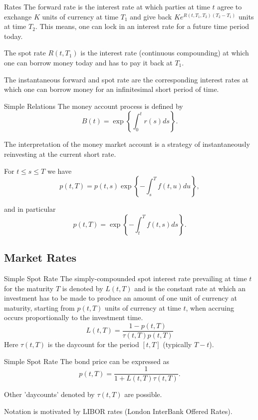 Rates
	The forward rate is the interest rate at which parties
	at time $t$ agree to exchange $K$ units of currency at time $T_1$
	and give back $Ke^{R(t,T_1,T_2)(T_2-T_1)}$ units at time $T_2$.
	This means, one can lock in an interest rate for a future time
	period today. 

	The spot rate $R(t,T_1)$ is the interest
	rate (continuous compounding) at which one can borrow money today
	and has to pay it back at $T_1$. 

	The instantaneous forward and spot rate are the corresponding interest rates at
	which one can borrow money for an infinitesimal short period of time.


Simple Relations
	The money account process is defined by
		$$
		B(t) = \exp\left\{ \int_0^t r(s) ds\right\}\!.
		$$

	The interpretation of the money market account is a strategy of
	instantaneously reinvesting at the current short rate.

	For $t \leq s \leq T$ we have
		$$
		p(t,T) = p(t,s) \exp\left\{-\int_s^T f(t,u) du\right\}\!,
		$$
 
	and in particular
		$$
		p(t,T) = \exp\left\{-\int_t^T f(t,s) ds\right\}\!.
		$$


\subsection{Market Rates}

Simple Spot Rate
	The simply-compounded spot interest rate prevailing at time $t$ for
	the maturity $T$ is denoted by $L(t,T)$ and is the constant rate
	at which an investment has to be made to produce an amount of one
	unit of currency at maturity, starting from $p(t,T)$ units of
	currency at time $t$, when accruing occurs proportionally to the
	investment time.
		\begin{equation}\label{LIBOR-spot}
		L(t,T)=\frac{1-p(t,T)}{\tau(t,T)p(t,T)}
		\end{equation}
	Here $\tau(t,T)$ is the
	daycount for the period $[t,T]$ (typically $T-t$).


Simple Spot Rate
	The bond price can be expressed as
		$$
		p(t,T)=\frac{1}{1+L(t,T)\tau(t,T)}.
		$$
	
	Other 'daycounts' denoted  by $\tau(t,T)$ are possible.
	
	Notation is motivated by LIBOR rates (London InterBank Offered Rates).



